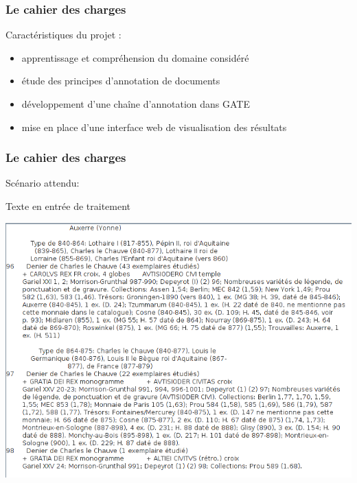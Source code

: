 \documentclass[10pt, compress]{beamer}
\begin{document}
\begin{frame}[fragile]
	\frametitle{Le cahier des charges}
	Caractéristiques du projet :\\
	\begin{itemize}[<+->]
	[square]
		\item{apprentissage et compréhension du domaine considéré}
		\item{étude des principes d'annotation de documents}
		\item{développement d'une chaîne d'annotation dans GATE}
		\item{mise en place d'une interface web de visualisation des résultats}
	\end{itemize}
\end{frame}

\begin{frame}[fragile]
	\frametitle{Le cahier des charges}
	Scénario attendu:
	\begin{scriptsize}
	Texte en entrée de traitement
	\end{scriptsize}
	\includegraphics[scale=0.3]{img/beforean.png}
\end{frame}
\end{document}
